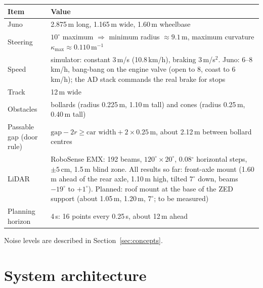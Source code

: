\documentclass[11pt,a4paper]{article}
\begin{document}
\begin{table}[h]
\small
\begin{tabularx}{\linewidth}{@{}lL@{}}
\toprule
Item & Value \\
\midrule
Juno & 2.875\,m long, 1.165\,m wide, 1.60\,m wheelbase \\
Steering & $10^\circ$ maximum $\Rightarrow$ minimum radius $\approx 9.1$\,m, maximum curvature $\kappa_{\max}\approx 0.110\,\mathrm{m}^{-1}$ \\
Speed & simulator: constant 3\,m/s (10.8\,km/h), braking 3\,m/s$^2$. Juno: 6--8\,km/h, bang-bang on the
engine valve (open to 8, coast to 6\,km/h); the AD stack commands the real brake for stops \\
Track & 12\,m wide \\
Obstacles & bollards (radius 0.225\,m, 1.10\,m tall) and cones (radius 0.25\,m, 0.40\,m tall) \\
Passable gap (door rule) & $\text{gap} - 2r \ge \text{car width} + 2\times 0.25$\,m, about 2.12\,m between bollard centres \\
LiDAR & RoboSense EMX: 192 beams, $120^\circ\times20^\circ$, 0.08$^\circ$ horizontal steps, $\pm5$\,cm, 1.5\,m blind zone.
All results so far: front-axle mount (1.60\,m ahead of the rear axle, 1.10\,m high, tilted $7^\circ$ down, beams $-19^\circ$
to $+1^\circ$). Planned: roof mount at the base of the ZED support (about 1.05\,m, 1.20\,m, $7^\circ$; to be measured) \\
Planning horizon & 4\,s: 16 points every 0.25\,s, about 12\,m ahead \\
\bottomrule
\end{tabularx}
\end{table}

Noise levels are described in Section~\ref{sec:concepts}.

\section{System architecture}
\end{document}
